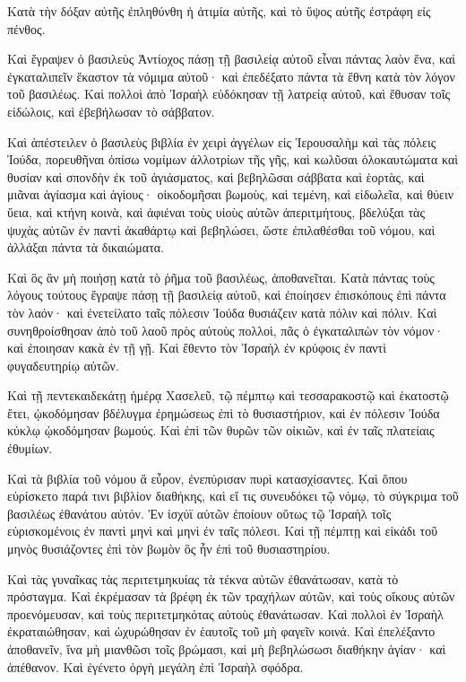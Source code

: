 {Κατὰ τὴν δόξαν αὐτῆς ἐπληθύνθη ἡ ἀτιμία αὐτῆς, καὶ τὸ ὕψος αὐτῆς ἐστράφη εἰς πένθος.
\par }{\PP {}Καὶ ἔγραψεν ὁ βασιλεὺς Ἀντίοχος πάσῃ τῇ βασιλείᾳ αὐτοῦ εἶναι πάντας λαὸν ἕνα,
καὶ ἐγκαταλιπεῖν ἕκαστον τὰ νόμιμα αὐτοῦ· καὶ ἐπεδέξατο πάντα τὰ ἔθνη κατὰ τὸν λόγον τοῦ βασιλέως.
Καὶ πολλοὶ ἀπὸ Ἰσραὴλ εὐδόκησαν τῇ λατρείᾳ αὐτοῦ, καὶ ἔθυσαν τοῖς εἰδώλοις, καὶ ἐβεβήλωσαν τὸ σάββατον.
\par }{\PP {}Καὶ ἀπέστειλεν ὁ βασιλεὺς βιβλία ἐν χειρὶ ἀγγέλων εἰς Ἱερουσαλὴμ καὶ τὰς πόλεις Ἰούδα, πορευθῆναι ὀπίσω νομίμων ἀλλοτρίων τῆς γῆς,
καὶ κωλῦσαι ὁλοκαυτώματα καὶ θυσίαν καὶ σπονδὴν ἐκ τοῦ ἁγιάσματος, καὶ βεβηλῶσαι σάββατα καὶ ἑορτὰς,
καὶ μιᾶναι ἁγίασμα καὶ ἁγίους·
οἰκοδομῆσαι βωμοὺς, καὶ τεμένη, καὶ εἰδωλεῖα, καὶ θύειν ὕεια, καὶ κτήνη κοινὰ,
καὶ ἀφιέναι τοὺς υἱοὺς αὐτῶν ἀπεριτμήτους, βδελύξαι τὰς ψυχὰς αὐτῶν ἐν παντὶ ἀκαθάρτῳ καὶ βεβηλώσει,
ὥστε ἐπιλαθέσθαι τοῦ νόμου, καὶ ἀλλάξαι πάντα τὰ δικαιώματα.
\par }{\PP {}Καὶ ὃς ἂν μὴ ποιήσῃ κατὰ τὸ ῥῆμα τοῦ βασιλέως, ἀποθανεῖται.
Κατὰ πάντας τοὺς λόγους τούτους ἔγραψε πάσῃ τῇ βασιλείᾳ αὐτοῦ, καὶ ἐποίησεν ἐπισκόπους ἐπὶ πάντα τὸν λαόν· καὶ ἐνετείλατο ταῖς πόλεσιν Ἰούδα θυσιάζειν κατὰ πόλιν καὶ πόλιν.
Καὶ συνηθροίσθησαν ἀπὸ τοῦ λαοῦ πρὸς αὐτοὺς πολλοὶ, πᾶς ὁ ἐγκαταλιπὼν τὸν νόμον· καὶ ἐποιησαν κακὰ ἐν τῇ γῇ.
Καὶ ἔθεντο τὸν Ἰσραὴλ ἐν κρύφοις ἐν παντὶ φυγαδευτηρίῳ αὐτῶν.
\par }{\PP {}Καὶ τῇ πεντεκαιδεκάτῃ ἡμέρᾳ Χασελεῦ, τῷ πέμπτῳ καὶ τεσσαρακοστῷ καὶ ἑκατοστῷ ἔτει, ᾠκοδόμησαν βδέλυγμα ἐρημώσεως ἐπὶ τὸ θυσιαστήριον, καὶ ἐν πόλεσιν Ἰούδα κύκλῳ ᾠκοδόμησαν βωμούς.
Καὶ ἐπὶ τῶν θυρῶν τῶν οἰκιῶν, καὶ ἐν ταῖς πλατείαις ἐθυμίων.
\par }{\PP {}Καὶ τὰ βιβλία τοῦ νόμου ἃ εὗρον, ἐνεπύρισαν πυρὶ κατασχίσαντες.
Καὶ ὅπου εὑρίσκετο παρά τινι βιβλίον διαθήκης, καὶ εἴ τις συνευδόκει τῷ νόμῳ, τὸ σύγκριμα τοῦ βασιλέως ἐθανάτου αὐτόν.
Ἐν ἰσχύϊ αὐτῶν ἐποίουν οὕτως τῷ Ἰσραὴλ τοῖς εὑρισκομένοις ἐν παντὶ μηνὶ καὶ μηνὶ ἐν ταῖς πόλεσι.
Καὶ τῇ πέμπτῃ καὶ εἰκάδι τοῦ μηνὸς θυσιάζοντες ἐπὶ τὸν βωμὸν ὃς ἦν ἐπὶ τοῦ θυσιαστηρίου.
\par }{\PP {}Καὶ τὰς γυναῖκας τὰς περιτετμηκυίας τὰ τέκνα αὐτῶν ἐθανάτωσαν, κατὰ τὸ πρόσταγμα.
Καὶ ἐκρέμασαν τὰ βρέφη ἐκ τῶν τραχήλων αὐτῶν, καὶ τοὺς οἴκους αὐτῶν προενόμευσαν, καὶ τοὺς περιτετμηκότας αὐτοὺς ἐθανάτωσαν.
Καὶ πολλοὶ ἐν Ἰσραὴλ ἐκραταιώθησαν, καὶ ὠχυρώθησαν ἐν ἑαυτοῖς τοῦ μὴ φαγεῖν κοινά.
Καὶ ἐπελέξαντο ἀποθανεῖν, ἵνα μὴ μιανθῶσι τοῖς βρώμασι, καὶ μὴ βεβηλώσωσι διαθήκην ἁγίαν· καὶ ἀπέθανον.
Καὶ ἐγένετο ὀργὴ μεγάλη ἐπὶ Ἰσραὴλ σφόδρα.

}
